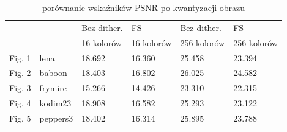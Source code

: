 \begin{table}[H]
    \caption{porównanie wskaźników PSNR po kwantyzacji obrazu}
    \centering
    \begin{tabular}{llllll}
    \hline
           &           & Bez dither.    & FS            & Bez dither.    & FS              \\
           &           & 16 kolorów     & 16 kolorów    & 256 kolorów    & 256 kolorów     \\ \hline
    Fig. 1 & lena      & 18.692         & 16.360        & 25.458         & 23.394          \\ 
    Fig. 2 & baboon    & 18.403         & 16.802        & 26.025         & 24.582          \\ 
    Fig. 3 & frymire   & 15.266         & 14.426        & 23.310         & 22.315          \\ 
    Fig. 4 & kodim23   & 18.908         & 16.582        & 25.293         & 23.122          \\ 
    Fig. 5 & peppers3  & 18.402         & 16.314        & 25.895         & 23.788          \\ \hline
    \end{tabular}
\end{table}




